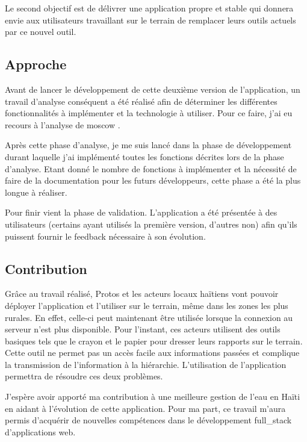 \documentclass{EPL-master-thesis-covers-FR}
\begin{document}
			Le second objectif est de délivrer une application propre et stable qui donnera envie aux utilisateurs travaillant sur le terrain de remplacer leurs outils actuels par ce nouvel outil.
			
			
		\subsection*{Approche}
			Avant de lancer le développement de cette deuxième version de l'application, un travail d'analyse conséquent a été réalisé afin de déterminer les différentes fonctionnalités à implémenter et la technologie à utiliser. Pour ce faire, j'ai eu recours à l'analyse de \gls{moscow} \cite{ref:moscow}.
		
			Après cette phase d'analyse, je me suis lancé dans la phase de développement durant laquelle j'ai implémenté toutes les fonctions décrites lors de la phase d'analyse. Etant donné le nombre de fonctions à implémenter et la nécessité de faire de la documentation pour les futurs développeurs, cette phase a été la plus longue à réaliser.
						
			Pour finir vient la phase de validation. L'application a été présentée à des utilisateurs (certains ayant utilisés la première version, d'autres non) afin qu'ils puissent fournir le feedback nécessaire à son évolution.
			
			
		\subsection*{Contribution}
			Grâce au travail réalisé, Protos et les acteurs locaux haïtiens vont pouvoir déployer l'application et l'utiliser sur le terrain, même dans les zones les plus rurales. En effet, celle-ci peut maintenant être utilisée lorsque la connexion au serveur n'est plus disponible. Pour l'instant, ces acteurs utilisent des outils basiques tels que le crayon et le papier pour dresser leurs rapports sur le terrain. Cette outil ne permet pas un accès facile aux informations passées et complique la transmission de l'information à la hiérarchie. L'utilisation de l'application permettra de résoudre ces deux problèmes.
			
			J'espère avoir apporté ma contribution à une meilleure gestion de l'eau en Haïti en aidant à l'évolution de cette application. Pour ma part, ce travail m'aura permis d'acquérir de nouvelles compétences dans le développement \gls{full_stack} d'applications web.
			
\end{document}
